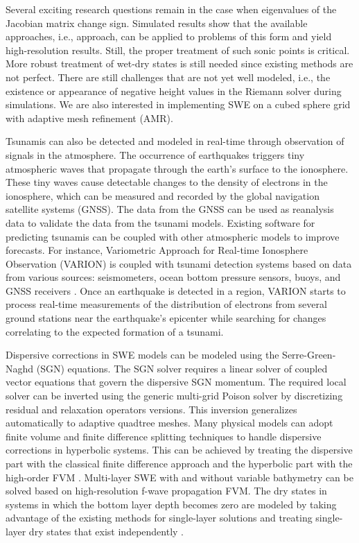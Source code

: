 \documentclass[10pt,a4paper]{article}
\begin{document}
	Several exciting research questions remain in the case when eigenvalues of the Jacobian matrix change sign. Simulated results show that the available approaches, i.e.,    \citet{ba-le-mi-ro:2003} approach, can be applied to problems of this form and yield high-resolution results. Still, the proper treatment of such sonic points is critical.
	More robust treatment of wet-dry states is still needed since existing methods are not perfect. There are still challenges that are not yet well modeled, i.e., the existence or appearance of negative height values in the Riemann solver during simulations.
	We are also interested in implementing SWE on a cubed sphere grid with adaptive mesh refinement (AMR).  
	
	
	Tsunamis can also be detected and modeled in real-time through observation of signals in the atmosphere. The occurrence of earthquakes triggers tiny atmospheric waves that propagate through the earth's surface to the ionosphere. These tiny waves cause detectable changes to the density of electrons in the ionosphere, which can be measured and recorded by the global navigation satellite systems (GNSS).  The data from the GNSS can be used as reanalysis data to validate the data from the tsunami models. Existing software for predicting tsunamis can be coupled with other atmospheric models to improve forecasts. For instance, Variometric Approach for Real-time Ionosphere Observation (VARION)  is coupled with tsunami detection systems based on data from various sources: seismometers, ocean bottom pressure sensors, buoys, and GNSS receivers \citep{savastano2017real}. Once an earthquake is detected in a region, VARION starts to process real-time measurements of the distribution of electrons from several ground stations near the earthquake's epicenter while searching for changes correlating to the expected formation of a tsunami.
	
	
	Dispersive corrections in SWE models can be modeled using the Serre-Green-Naghd (SGN) equations. The SGN solver requires a linear solver of coupled vector equations that govern the dispersive SGN momentum.  The required local solver can be inverted using the generic multi-grid Poison solver by discretizing residual and relaxation operators versions. This inversion generalizes automatically to adaptive quadtree meshes. Many physical models can adopt finite volume and finite difference splitting techniques to handle dispersive corrections in hyperbolic systems.  This can be achieved by treating the dispersive part with the classical finite difference approach and the hyperbolic part with the high-order FVM \citep{la-bo:2009,po:2020,po:2015}. 
	Multi-layer SWE with and without variable bathymetry can be solved based on high-resolution f-wave propagation FVM. The dry states in systems in which the bottom layer depth becomes zero are modeled by taking advantage of the existing methods for single-layer solutions and treating single-layer dry states that exist independently \citep{mandli2013numerical}.
	
\end{document}

